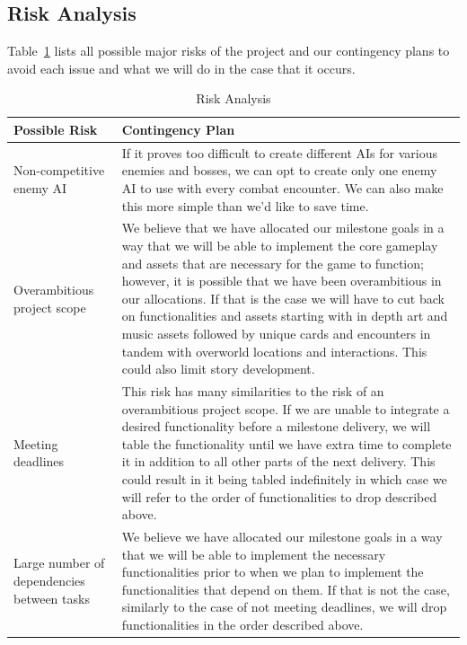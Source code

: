 \documentclass[12pt,titlepage]{article}
\begin{document}
\subsection{Risk Analysis}

Table~\ref{tab:risks} lists all possible major risks of the project and
our contingency plans to avoid each issue and what we will do in the case that
it occurs.

\begin{table}[H]
    \caption{Risk Analysis}
    \label{tab:risks}
    \centering
    \begin{tabularx}{\linewidth}{|l|X|}
        \hline
        \textbf{Possible Risk} & \textbf{Contingency Plan} \\
        \hline\hline
        Non-competitive enemy AI & If it proves too difficult to create
        different AIs for various enemies and bosses, we can opt to create
        only one enemy AI to use with every combat encounter. We can also
        make this more simple than we'd like to save time. \\
        \hline
        Overambitious project scope & We believe that we have allocated our
        milestone goals in a way that we will be able to implement the core
        gameplay and assets that are necessary for the game to function;
        however, it is possible that we have been overambitious in our
        allocations. If that is the case we will have to cut back on
        functionalities and assets starting with in depth art and music assets
        followed by unique cards and encounters in tandem with overworld
        locations and interactions. This could also limit story development.  \\
        \hline
        Meeting deadlines & This risk has many similarities to the risk of an
        overambitious project scope. If we are unable to integrate a desired
        functionality before a milestone delivery, we will table the
        functionality until we have extra time to complete it in addition to
        all other parts of the next delivery. This could result in it being
        tabled indefinitely in which case we will refer to the order of
        functionalities to drop described above. \\
        \hline
        Large number of dependencies between tasks & We believe we have
        allocated our milestone goals in a way that we will be able to
        implement the necessary functionalities prior to when we plan to
        implement the functionalities that depend on them. If that is not the
        case, similarly to the case of not meeting deadlines, we will drop
        functionalities in the order described above. \\
        \hline
    \end{tabularx}
\end{table}
\end{document}
